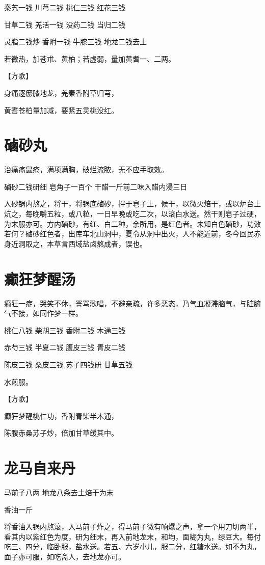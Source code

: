 \documentclass[a4paper,12pt,UTF8,twoside]{ctexbook}
\begin{document}
	
	秦艽一钱 川芎二钱 桃仁三钱 红花三钱
	
	甘草二钱 羌活一钱 没药二钱 当归二钱
	
	灵脂二钱炒 香附一钱 牛膝三钱 地龙二钱去土
	
	若微热，加苍朮、黄柏；若虚弱，量加黄耆一、二两。
	
	【方歌】
	
	身痛逐瘀膝地龙，羌秦香附草归芎，
	
	黄耆苍柏量加减，要紧五灵桃没红。
	
	\section{磠砂丸}
	
	
	治痛疡鼠疮，满项满胸，破烂流脓，无不应手取效。
	
	磠砂二钱研细 皂角子一百个 干醋一斤前二味入醋内浸三日
	
	入砂锅内熬之，将干，将锅底磠砂，拌于皂子上，候干，以微火焙干，或以炉台上炕之，每晚嚼五粒，或八粒，一日早晚或吃二次，以滚白水送。然干则皂子过硬，为末服亦可。方内磠砂，有红、白二种，余所用，是红色者。未知白色磠砂，功效若何？磠砂红色者，出库车北山洞中，夏令从洞中出火，人不能近前，冬今回民赤身近洞取之，本草言西域盐卤熬成者，误也。
	
	\section{癫狂梦醒汤}
	
	
	癫狂一症，哭笑不休，詈骂歌唱，不避亲疏，许多恶态，乃气血凝滞脑气，与脏腑气不接，如同作梦一样。
	
	桃仁八钱 柴胡三钱 香附二钱 木通三钱
	
	赤芍三钱 半夏二钱 腹皮三钱 青皮二钱
	
	陈皮三钱 桑皮三钱 苏子四钱研 甘草五钱
	
	水煎服。
	
	【方歌】
	
	癫狂梦醒桃仁功，香附青柴半木通，
	
	陈腹赤桑苏子炒，倍加甘草缓其中。
	
	\section{龙马自来丹}
	
	
	马前子八两 地龙八条去土焙干为末
	
	香油一斤
	
	将香油入锅内熬滚，入马前子炸之，得马前子微有响爆之声，拿一个用刀切两半，看其内以紫红色为度，研为细末，再入前地龙末，和均，面糊为丸，绿豆大。每付吃三、四分，临卧服，盐水送。若五、六岁小儿，服二分，红糖水送。如不为丸，面子亦可服，如吃斋人，去地龙亦可。
	
\end{document}
